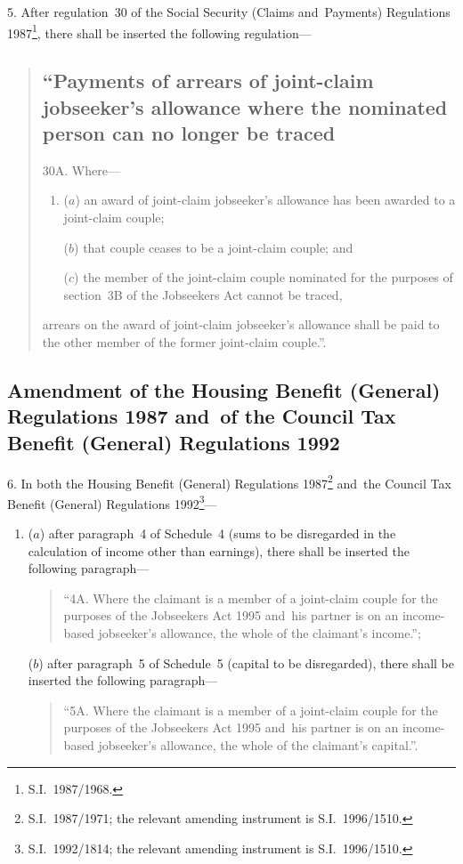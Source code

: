 \documentclass[12pt,a4paper]{article}
\begin{document}
5.  After regulation~30 of the Social Security (Claims and~Payments) Regulations 1987\footnote{S.I.~1987/1968.}, there shall be inserted the following regulation—
\begin{quotation}
\subsection*{“Payments of arrears of joint-claim jobseeker’s allowance where the nominated person can no longer be traced}

30A.  Where—
\begin{enumerate}\item[]
($a$) an award of joint-claim jobseeker’s allowance has been awarded to a joint-claim couple;

($b$) that couple ceases to be a joint-claim couple; and

($c$) the member of the joint-claim couple nominated for the purposes of section~3B of the Jobseekers Act cannot be traced,
\end{enumerate}
arrears on the award of joint-claim jobseeker’s allowance shall be paid to the other member of the former joint-claim couple.”.
\end{quotation}

\subsection[6. Amendment of the Housing Benefit (General) Regulations 1987 and~of the Council Tax Benefit (General) Regulations 1992]{Amendment of the Housing Benefit (General) Regulations 1987 and~of the Council Tax Benefit (General) Regulations 1992}

6.  In both the Housing Benefit (General) Regulations 1987\footnote{S.I.~1987/1971; the relevant amending instrument is S.I.~1996/1510.} and~the Council Tax Benefit (General) Regulations 1992\footnote{S.I.~1992/1814; the relevant amending instrument is S.I.~1996/1510.}—
\begin{enumerate}\item[]
($a$) after paragraph~4 of Schedule~4 (sums to be disregarded in the calculation of income other than earnings), there shall be inserted the following paragraph—
\begin{quotation}
“4A.  Where the claimant is a member of a joint-claim couple for the purposes of the Jobseekers Act 1995 and~his partner is on an income-based jobseeker’s allowance, the whole of the claimant’s income.”;
\end{quotation}

($b$) after paragraph~5 of Schedule~5 (capital to be disregarded), there shall be inserted the following paragraph—
\begin{quotation}
“5A.  Where the claimant is a member of a joint-claim couple for the purposes of the Jobseekers Act 1995 and~his partner is on an income-based jobseeker’s allowance, the whole of the claimant’s capital.”.
\end{quotation}
\end{enumerate}
\end{document}

